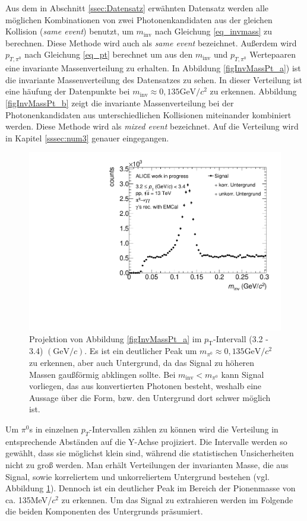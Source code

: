 \documentclass[11pt]{article}
\begin{document}
	Aus dem in Abschnitt \ref{ssec:Datensatz} erw{\"a}hnten Datensatz werden alle m{\"o}glichen Kombinationen von zwei Photonenkandidaten aus der gleichen Kollision ({\it same event}) benutzt, um $m_{\text{inv}}$ nach Gleichung \ref{eq_invmass} zu berechnen. Diese Methode wird auch als {\it same event} bezeichnet. Au{\ss}erdem wird $p_{T,\pi^{0}}$ nach Gleichung \ref{eq_pt} berechnet um aus den $m_{\text{inv}}$ und $p_{T,\pi^{0}}$ Wertepaaren eine invariante Massenverteilung zu erhalten. In Abbildung \ref{figInvMassPt_a}) ist die invariante Massenverteilung des Datensatzes zu sehen. In dieser Verteilung ist eine h{\"a}ufung der Datenpunkte bei $m_{\text{inv}}\approx 0,135\text{GeV/}c^{2}$ zu erkennen. Abbildung \ref{figInvMassPt_b} zeigt die invariante Massenverteilung bei der Photonenkandidaten aus unterschiedlichen Kollisionen miteinander kombiniert werden. Diese Methode wird als {\it mixed event} bezeichnet. Auf die Verteilung wird in Kapitel \ref{sssec:num3} genauer eingegangen.

	\begin{figure}[tbp]
		\centering
		\includegraphics[width=.7\linewidth]{hSignalPlusBkg.pdf}
		\caption{Projektion von Abbildung \ref{figInvMassPt_a} im $p_{\text{T}}$-Intervall (3.2 - 3.4) $(\text{GeV/}c)$. Es ist ein deutlicher Peak um $m_{\pi^{0}} \approx 0,135\text{GeV/}c^{2}$ zu erkennen, aber auch Untergrund, da das Signal zu h{\"o}heren Massen gau{\ss}f{\"o}rmig abklingen sollte. Bei $m_{\text{inv}} < m_{\pi^{0}}$ kann Signal vorliegen, das aus konvertierten Photonen besteht, weshalb eine Aussage {\"u}ber die Form, bzw. den Untergrund dort schwer m{\"o}glich ist.}
		\label{figSignalPlusBkg}
	\end{figure}

	Um $\pi^{0}$s in einzelnen $p_{T}$-Intervallen z{\"a}hlen zu k{\"o}nnen wird die Verteilung in entsprechende Abst{\"a}nden auf die Y-Achse projiziert. Die Intervalle werden so gew{\"a}hlt, dass sie m{\"o}glichst klein sind, w{\"a}hrend die statistischen Unsicherheiten nicht zu gro{\ss} werden. Man erh{\"a}lt Verteilungen der invarianten Masse, die aus Signal, sowie korreliertem und unkorreliertem Untergrund bestehen (vgl. Abbildung \ref{figSignalPlusBkg}). Dennoch ist ein deutlicher Peak im Bereich der Pionenmasse von ca. 135MeV/$c^{2}$ zu erkennen. Um das Signal zu extrahieren werden im Folgende die beiden Komponenten des Untergrunds pr{\"a}sumiert.
\end{document}
